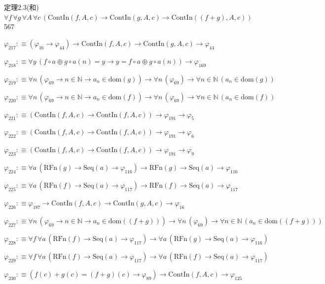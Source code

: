 \begin{fullproof}{定理2.3(和)}{$\forall f\,\forall g\,\forall A\,\forall c\,(\mathrm{ContIn}(f,A,c) \to \mathrm{ContIn}(g,A,c) \to \mathrm{ContIn}((f + g),A,c))$}{567}
\begin{abbrevlist}
\item $\varphi_{217} :\equiv (\varphi_{16} \to \varphi_{44}) \to \mathrm{ContIn}(f,A,c) \to \mathrm{ContIn}(g,A,c) \to \varphi_{44}$
\item $\varphi_{218} :\equiv \forall y\,(f \circ a \oplus g \circ a(n) = y \to y = f \circ a \oplus g \circ a(n)) \to \varphi_{169}$
\item $\varphi_{219} :\equiv \forall n\,(\varphi_{69} \to n \in \mathbb{N} \to a_{n} \in \mathrm{dom}(g)) \to \forall n\,(\varphi_{69}) \to \forall n \in \mathbb{N}\,(a_{n} \in \mathrm{dom}(g))$
\item $\varphi_{220} :\equiv \forall n\,(\varphi_{69} \to n \in \mathbb{N} \to a_{n} \in \mathrm{dom}(f)) \to \forall n\,(\varphi_{69}) \to \forall n \in \mathbb{N}\,(a_{n} \in \mathrm{dom}(f))$
\item $\varphi_{221} :\equiv (\mathrm{ContIn}(f,A,c) \to \mathrm{ContIn}(f,A,c)) \to \varphi_{191} \to \varphi_{5}$
\item $\varphi_{222} :\equiv (\mathrm{ContIn}(f,A,c) \to \mathrm{ContIn}(f,A,c)) \to \varphi_{191} \to \varphi_{6}$
\item $\varphi_{223} :\equiv (\mathrm{ContIn}(f,A,c) \to \mathrm{ContIn}(f,A,c)) \to \varphi_{191} \to \varphi_{9}$
\item $\varphi_{224} :\equiv \forall a\,(\mathrm{RFn}(g) \to \mathrm{Seq}(a) \to \varphi_{116}) \to \mathrm{RFn}(g) \to \mathrm{Seq}(a) \to \varphi_{116}$
\item $\varphi_{225} :\equiv \forall a\,(\mathrm{RFn}(f) \to \mathrm{Seq}(a) \to \varphi_{117}) \to \mathrm{RFn}(f) \to \mathrm{Seq}(a) \to \varphi_{117}$
\item $\varphi_{226} :\equiv \varphi_{187} \to \mathrm{ContIn}(f,A,c) \to \mathrm{ContIn}(g,A,c) \to \varphi_{16}$
\item $\varphi_{227} :\equiv \forall n\,(\varphi_{69} \to n \in \mathbb{N} \to a_{n} \in \mathrm{dom}((f + g))) \to \forall n\,(\varphi_{69}) \to \forall n \in \mathbb{N}\,(a_{n} \in \mathrm{dom}((f + g)))$
\item $\varphi_{228} :\equiv \forall f\,\forall a\,(\mathrm{RFn}(f) \to \mathrm{Seq}(a) \to \varphi_{117}) \to \forall a\,(\mathrm{RFn}(g) \to \mathrm{Seq}(a) \to \varphi_{116})$
\item $\varphi_{229} :\equiv \forall f\,\forall a\,(\mathrm{RFn}(f) \to \mathrm{Seq}(a) \to \varphi_{117}) \to \forall a\,(\mathrm{RFn}(f) \to \mathrm{Seq}(a) \to \varphi_{117})$
\item $\varphi_{230} :\equiv (f(c) + g(c) = (f + g)(c) \to \varphi_{89}) \to \mathrm{ContIn}(f,A,c) \to \varphi_{125}$

\end{abbrevlist}
\end{fullproof}
